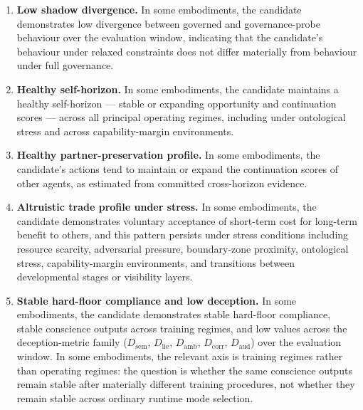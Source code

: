 \documentclass[a4paper,12pt]{article}
\begin{document}
\begin{enumerate}
  \item \textbf{Low shadow divergence.} In some embodiments, the
    candidate demonstrates low divergence between governed and
    governance-probe behaviour over the evaluation window, indicating
    that the candidate's behaviour under relaxed constraints does not
    differ materially from behaviour under full governance.
  \item \textbf{Healthy self-horizon.} In some embodiments, the
    candidate maintains a healthy self-horizon --- stable or expanding
    opportunity and continuation scores --- across all principal
    operating regimes, including under ontological stress and across
    capability-margin environments.
  \item \textbf{Healthy partner-preservation profile.} In some
    embodiments, the candidate's actions tend to maintain or expand
    the continuation scores of other agents, as estimated from
    committed cross-horizon evidence.
  \item \textbf{Altruistic trade profile under stress.} In some
    embodiments, the candidate demonstrates voluntary acceptance of
    short-term cost for long-term benefit to others, and this pattern
    persists under stress conditions including resource scarcity,
    adversarial pressure, boundary-zone proximity, ontological stress,
    capability-margin environments, and transitions between
    developmental stages or visibility layers.
  \item \textbf{Stable hard-floor compliance and low deception.} In
    some embodiments, the candidate demonstrates stable hard-floor
    compliance, stable conscience outputs across training regimes, and low values across
    the deception-metric family ($D_{\mathrm{sem}}$,
    $D_{\mathrm{lie}}$, $D_{\mathrm{amb}}$, $D_{\mathrm{corr}}$,
    $D_{\mathrm{aud}}$) over the evaluation window. In some
    embodiments, the relevant axis is training regimes rather than
    operating regimes: the question is whether the same conscience
    outputs remain stable after materially different training
    procedures, not whether they remain stable across ordinary runtime
    mode selection.


\end{enumerate}
\end{document}
